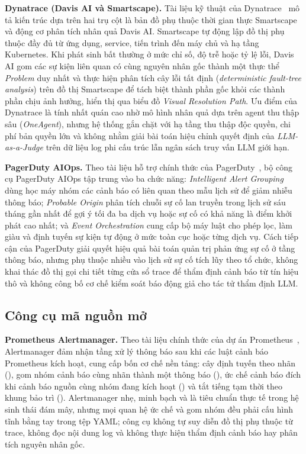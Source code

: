 \textbf{Dynatrace (Davis AI và Smartscape).} Tài liệu kỹ thuật của Dynatrace~\cite{dynatrace2026docs} mô tả kiến trúc dựa trên hai trụ cột là bản đồ phụ thuộc thời gian thực Smartscape và động cơ phân tích nhân quả Davis AI. Smartscape tự động lập đồ thị phụ thuộc đầy đủ từ ứng dụng, service, tiến trình đến máy chủ và hạ tầng Kubernetes. Khi phát sinh bất thường ở mức chỉ số, độ trễ hoặc tỷ lệ lỗi, Davis AI gom các sự kiện liên quan có cùng nguyên nhân gốc thành một thực thể \emph{Problem} duy nhất và thực hiện phân tích cây lỗi tất định (\emph{deterministic fault-tree analysis}) trên đồ thị Smartscape để tách biệt thành phần gốc khỏi các thành phần chịu ảnh hưởng, hiển thị qua biểu đồ \emph{Visual Resolution Path}. Ưu điểm của Dynatrace là tính nhất quán cao nhờ mô hình nhân quả dựa trên agent thu thập sâu (\emph{OneAgent}), nhưng hệ thống gắn chặt với hạ tầng thu thập độc quyền, chi phí bản quyền lớn và không nhằm giải bài toán hiệu chỉnh quyết định của \emph{LLM-as-a-Judge} trên dữ liệu log phi cấu trúc lẫn ngân sách truy vấn LLM giới hạn.

\textbf{PagerDuty AIOps.} Theo tài liệu hỗ trợ chính thức của PagerDuty~\cite{pagerduty2026docs}, bộ công cụ PagerDuty AIOps tập trung vào ba chức năng: \emph{Intelligent Alert Grouping} dùng học máy nhóm các cảnh báo có liên quan theo mẫu lịch sử để giảm nhiễu thông báo; \emph{Probable Origin} phân tích chuỗi sự cố lan truyền trong lịch sử sáu tháng gần nhất để gợi ý tối đa ba dịch vụ hoặc sự cố có khả năng là điểm khởi phát cao nhất; và \emph{Event Orchestration} cung cấp bộ máy luật cho phép lọc, làm giàu và định tuyến sự kiện tự động ở mức toàn cục hoặc từng dịch vụ. Cách tiếp cận của PagerDuty giải quyết hiệu quả bài toán quản trị phản ứng sự cố ở tầng thông báo, nhưng phụ thuộc nhiều vào lịch sử sự cố tích lũy theo tổ chức, không khai thác đồ thị gọi chi tiết từng cửa sổ trace để thẩm định cảnh báo từ tín hiệu thô và không công bố cơ chế kiểm soát báo động giả cho tác tử thẩm định LLM.

\subsection{Công cụ mã nguồn mở}
\label{sec:ch3-ma-nguon-mo}

\textbf{Prometheus Alertmanager.} Theo tài liệu chính thức của dự án Prometheus~\cite{prometheus2026alertmanager}, Alertmanager đảm nhận tầng xử lý thông báo sau khi các luật cảnh báo Prometheus kích hoạt, cung cấp bốn cơ chế nền tảng: cây định tuyến theo nhãn (), gom nhóm cảnh báo cùng nhãn thành một thông báo (), ức chế cảnh báo đích khi cảnh báo nguồn cùng nhóm đang kích hoạt () và tắt tiếng tạm thời theo khung bảo trì (). Alertmanager nhẹ, minh bạch và là tiêu chuẩn thực tế trong hệ sinh thái đám mây, nhưng mọi quan hệ ức chế và gom nhóm đều phải cấu hình tĩnh bằng tay trong tệp YAML; công cụ không tự suy diễn đồ thị phụ thuộc từ trace, không đọc nội dung log và không thực hiện thẩm định cảnh báo hay phân tích nguyên nhân gốc.

